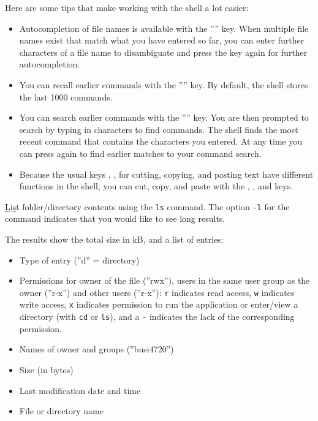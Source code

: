 \noindent Here are some tips that make working with the shell a lot easier:

\begin{itemize}
  \item Autocompletion of file names is available with the '''' key. When multiple file names exist that match what you have entered so far, you can enter further characters of a file name to disambiguate and press the  key again for further autocompletion. 
  \item You can recall earlier commands with the '''' key. By default, the shell stores the last 1000 commands.
  \item You can search earlier commands with the '''' key. You are then prompted to search by typing in characters to find commands. The shell finds the most recent command that contains the  characters you entered. At any time you can press  again to find earlier matches to your command search. 
  \item Because the usual keys , ,  for cutting, copying, and pasting text have different functions in the shell, you can cut, copy, and paste with the , , and  keys.
\end{itemize}

\noindent\underline{L}i\underline{s}t folder/directory contents using the \texttt{ls} command. The option \texttt{-l} for the command indicates that you would like to see long results. 

\scriptsize
{}
\normalsize

\noindent The results show the total size in kB, and a list of entries:
\begin{itemize}
  \item Type of entry (''d'' = directory)
  \item Permissions for owner of the file (''rwx''), users in the same user group as the owner (''r-x'') and other users (''r-x''): \texttt{r} indicates read access, \texttt{w} indicates write access, \texttt{x} indicates permission to run the application or enter/view a directory (with \texttt{cd} or \texttt{ls}), and a \texttt{-} indicates the lack of the corresponding permission. 
  \item Names of owner and groups (''busi4720'')
  \item Size (in bytes)
  \item Last modification date and time
  \item File or directory name
\end{itemize}

